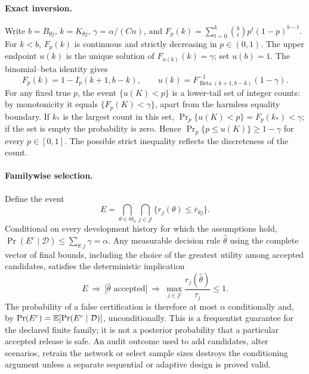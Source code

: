 \paragraph{Exact inversion.}
Write $b=B_{\theta j}$, $k=K_{\theta j}$,
$\gamma=\alpha/(Cn)$, and
$F_p(k)=\sum_{t=0}^{k}\binom{b}{t}p^t(1-p)^{b-t}$. For $k<b$,
$F_p(k)$ is continuous and strictly decreasing in $p\in(0,1)$.
The upper endpoint $u(k)$ is the unique solution of $F_{u(k)}(k)=\gamma$;
set $u(b)=1$. The binomial--beta identity gives
\begin{equation}
 F_p(k)=1-I_p(k+1,b-k),\qquad
 u(k)=F^{-1}_{\operatorname{Beta}(k+1,b-k)}(1-\gamma).
 \label{eq:neural-inversion}
\end{equation}
For any fixed true $p$, the event $\{u(K)<p\}$ is a lower-tail set of
integer counts: by monotonicity it equals $\{F_p(K)<\gamma\}$, apart from
the harmless equality boundary. If $k_*$ is the largest count in this set,
$\Pr_p\{u(K)<p\}=F_p(k_*)<\gamma$; if the set is empty the probability is
zero. Hence $\Pr_p\{p\leq u(K)\}\geq1-\gamma$ for every $p\in[0,1]$.
The possible strict inequality reflects the discreteness of the count.

\paragraph{Familywise selection.}
Define the event
\begin{equation}
 E=\bigcap_{\theta\in\Theta_0}\bigcap_{j\in\mathcal J}
 \{r_j(\theta)\leq\overline r_{\theta j}\}.
 \label{eq:neural-good-event}
\end{equation}
Conditional on every development history for which the assumptions hold,
$\Pr(E^c\mid\mathcal D)\leq\sum_{\theta,j}\gamma=\alpha$.
Any measurable decision rule $\widehat\theta$ using the complete vector of
final bounds, including the choice of the greatest utility among accepted
candidates, satisfies the deterministic implication
\begin{equation}
 E\ \Longrightarrow\
 \bigl[\widehat\theta\text{ accepted}\bigr]\ \Longrightarrow\
 \max_{j\in\mathcal J}\frac{r_j(\widehat\theta)}{\tau_j}\leq1.
 \label{eq:neural-implication}
\end{equation}
The probability of a false certification is therefore at most $\alpha$
conditionally and, by $\Pr(E^c)=\mathbb{E}[\Pr(E^c\mid\mathcal D)]$, unconditionally.
This is a frequentist guarantee for the declared finite family; it is not a
posterior probability that a particular accepted release is safe. An audit
outcome used to add candidates, alter scenarios, retrain the network or select
sample sizes destroys the conditioning argument unless a separate sequential
or adaptive design is proved valid.

